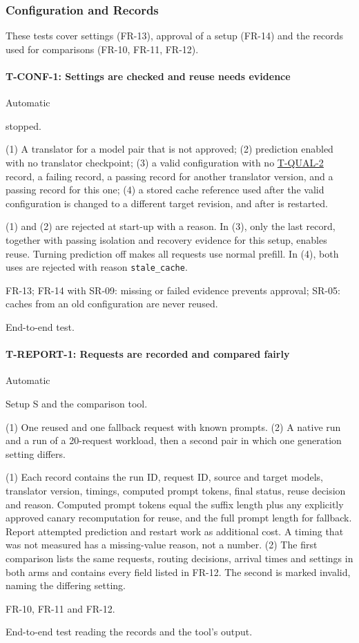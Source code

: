 \documentclass[12pt, titlepage]{article}
\newenvironment{testcase}[2]
  {\Needspace{8\baselineskip}\paragraph{#1: #2}\phantomsection\label{test:#1}\sloppy
   \begin{description}[style=sameline, leftmargin=3.6cm, labelwidth=3.4cm,
     font=\normalfont\bfseries, itemsep=2pt, topsep=2pt]}
  {\end{description}}
\newcommand{\tref}[1]{\hyperref[test:#1]{#1}}
\begin{document}
\subsubsection{Configuration and Records}

These tests cover settings (FR-13), approval of a setup (FR-14) and the
records used for comparisons (FR-10, FR-11, FR-12).

\begin{testcase}{T-CONF-1}{Settings are checked and reuse needs evidence}
\item[Control] Automatic
\item[Initial state] \progname{} stopped.
\item[Input] (1) A translator for a model pair that is not approved;
(2) prediction enabled with no translator checkpoint; (3) a valid
configuration with no \tref{T-QUAL-2} record, a failing record, a passing
record for another translator version, and a passing record for this one;
(4) a stored cache reference used after the valid configuration is
changed to a different target revision, and after \progname{} is
restarted.
\item[Output] (1) and (2) are rejected at start-up with a reason. In (3),
only the last record, together with passing isolation and recovery
evidence for this setup, enables reuse. Turning prediction off makes all
requests use normal prefill. In (4), both uses are rejected with reason \texttt{stale\_cache}.
\item[Derivation] FR-13; FR-14 with SR-09: missing or failed evidence
prevents approval; SR-05: caches from an old configuration are never
reused.
\item[How performed] End-to-end test.
\end{testcase}

\begin{testcase}{T-REPORT-1}{Requests are recorded and compared fairly}
\item[Control] Automatic
\item[Initial state] Setup S and the comparison tool.
\item[Input] (1) One reused and one fallback request with known prompts.
(2) A native run and a \progname{} run of a 20-request workload, then a
second pair in which one generation setting differs.
\item[Output] (1) Each record contains the run ID, request ID, source and
target models, translator version, timings, computed prompt tokens, final
status, reuse decision and reason. Computed prompt tokens equal the suffix length plus any explicitly
approved canary recomputation for reuse, and the full prompt length for
fallback. Report attempted prediction and restart work as additional cost.
A timing that was not measured has a missing-value reason, not a number.
(2) The first comparison lists the same requests, routing decisions,
arrival times and settings in both arms and contains every field listed in
FR-12. The second is marked invalid, naming the differing setting.
\item[Derivation] FR-10, FR-11 and FR-12.
\item[How performed] End-to-end test reading the records and the tool's output.
\end{testcase}
\end{document}
